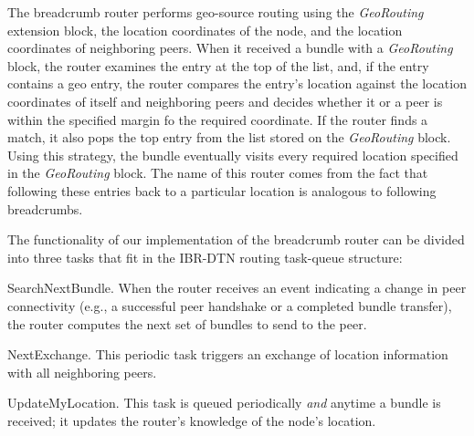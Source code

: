 
The {\sc breadcrumb} router performs geo-source routing using the {\em GeoRouting} extension block, the location coordinates of the node, and the location coordinates of neighboring peers. When it received a bundle with a {\em GeoRouting} block, the router examines the entry at the top of the list, and, if the entry contains a geo entry, the router compares the entry's location against the location coordinates of itself and neighboring peers and decides whether it or a peer is within the specified margin fo the required coordinate. If the router finds a match, it also pops the top entry from the list stored on the {\em GeoRouting} block. Using this strategy, the bundle eventually visits every required location specified in the {\em GeoRouting} block. The name of this router comes from the fact that following these entries back to a particular location is analogous to following breadcrumbs.

The functionality of our implementation of the {\sc breadcrumb} router can be divided into three tasks that fit in the IBR-DTN routing task-queue structure:
\begin{description*}
\item[SearchNextBundle.] When the router receives an event indicating a change in peer connectivity (e.g., a successful peer handshake or a completed bundle transfer), the router computes the next set of bundles to send to the peer.
\item[NextExchange.] This periodic task triggers an exchange of location information with all neighboring peers.
\item[UpdateMyLocation.] This task is queued periodically {\em and} anytime a bundle is received; it updates the router's knowledge of the node's location.
\end{description*}

